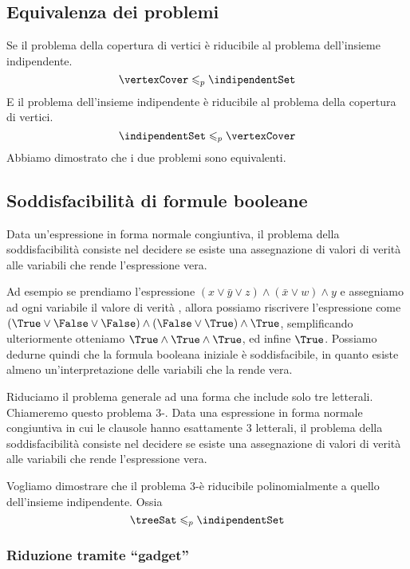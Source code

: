 \subsection{Equivalenza dei problemi}

Se il problema della copertura di vertici è riducibile al problema dell'insieme indipendente.
\[
    \vertexCover \leqslant_p \indipendentSet
\]
E il problema dell'insieme indipendente è riducibile al problema della copertura di vertici.
\[
    \indipendentSet \leqslant_p \vertexCover
\]
Abbiamo dimostrato che i due problemi sono equivalenti.

\subsection{Soddisfacibilità di formule booleane}

Data un'espressione in forma normale congiuntiva, il problema della soddisfacibilità consiste nel decidere se esiste una assegnazione di valori di verità alle variabili che rende l'espressione vera.

Ad esempio se prendiamo l'espressione \((x \lor \bar{y} \lor z) \land (\bar{x} \lor w) \land y\) e assegniamo ad ogni variabile il valore di verità \True, allora possiamo riscrivere l'espressione come \((\True \lor \False \lor \False) \land (\False \lor \True) \land \True\), semplificando ulteriormente otteniamo \(\True \land \True \land \True\), ed infine \(\True\).
Possiamo dedurne quindi che la formula booleana iniziale è soddisfacibile, in quanto esiste almeno un'interpretazione delle variabili che la rende vera.

Riduciamo il problema generale ad una forma che include solo tre letterali.
Chiameremo questo problema 3-\sat.
Data una espressione in forma normale congiuntiva in cui le clausole hanno esattamente 3 letterali, il problema della soddisfacibilità consiste nel decidere se esiste una assegnazione di valori di verità alle variabili che rende l'espressione vera.

Vogliamo dimostrare che il problema 3-\sat è riducibile polinomialmente a quello dell'insieme indipendente. Ossia
\[
    {\treeSat} \leqslant_p \indipendentSet
\]

\subsubsection*{Riduzione tramite \enquote{gadget}}

